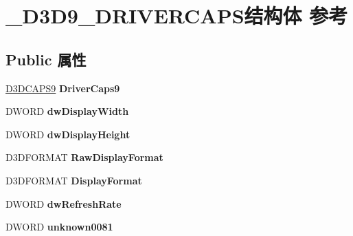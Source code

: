 \hypertarget{struct___d3_d9___d_r_i_v_e_r_c_a_p_s}{}\section{\+\_\+\+D3\+D9\+\_\+\+D\+R\+I\+V\+E\+R\+C\+A\+P\+S结构体 参考}
\label{struct___d3_d9___d_r_i_v_e_r_c_a_p_s}
\subsection*{Public 属性}
\begin{DoxyCompactItemize}
\item 
\mbox{\label{struct___d3_d9___d_r_i_v_e_r_c_a_p_s_aec96e82528cad9bdc05786c5c65c8da4}} 
\hyperlink{struct___d3_d_c_a_p_s9}{D3\+D\+C\+A\+P\+S9} {\bfseries Driver\+Caps9}
\item 
\mbox{\label{struct___d3_d9___d_r_i_v_e_r_c_a_p_s_a6c1782634376a803706530f3ec785c3b}} 
D\+W\+O\+RD {\bfseries dw\+Display\+Width}
\item 
\mbox{\label{struct___d3_d9___d_r_i_v_e_r_c_a_p_s_adde701acb810d49d1fea6081885ad519}} 
D\+W\+O\+RD {\bfseries dw\+Display\+Height}
\item 
\mbox{\label{struct___d3_d9___d_r_i_v_e_r_c_a_p_s_aaf8d77c640dc615e3540565a22e0e0d3}} 
D3\+D\+F\+O\+R\+M\+AT {\bfseries Raw\+Display\+Format}
\item 
\mbox{\label{struct___d3_d9___d_r_i_v_e_r_c_a_p_s_a641954e37eeedd813fe7b5f9d68867c8}} 
D3\+D\+F\+O\+R\+M\+AT {\bfseries Display\+Format}
\item 
\mbox{\label{struct___d3_d9___d_r_i_v_e_r_c_a_p_s_a8657e18c8948ea299ca216e691bde7a6}} 
D\+W\+O\+RD {\bfseries dw\+Refresh\+Rate}
\item 
\mbox{\label{struct___d3_d9___d_r_i_v_e_r_c_a_p_s_a5dcc4d9766ae396b57c198d4ebb8e213}} 
D\+W\+O\+RD {\bfseries unknown0081}
\item 

\end{DoxyCompactItemize}
